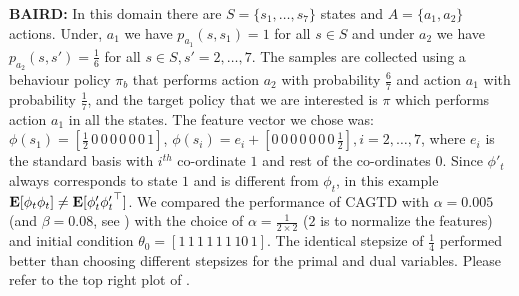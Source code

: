 \textbf{BAIRD:} In this domain there are $S=\{s_1,\ldots,s_7\}$ states and $A=\{a_1,a_2\}$ actions. Under, $a_1$ we have $p_{a_1}(s,s_1)=1$ for all $s\in S$ and under $a_2$ we have $p_{a_2}(s,s')=\frac{1}{6}$ for all $s\in S, s'=2,\ldots,7$. The samples are collected using a behaviour policy $\pi_b$ that performs action $a_2$ with probability $\frac{6}{7}$ and action $a_1$ with probability $\frac17$, and the target policy that we are interested is $\pi$ which performs action $a_1$ in all the states. The feature vector we chose was: $\phi(s_1)=[\frac{1}{2}\,0\,0\,0\,0\,0\,0\,1]$, $\phi(s_i)=e_i+[0\,0\,0\,0\,0\,0\,0\,\frac{1}{2}], i=2,\ldots,7$, where $e_i$ is the standard basis with $i^{th}$ co-ordinate $1$ and rest of the co-ordinates $0$. Since $\phi'_t$ always corresponds to state $1$ and is different from $\phi_t$, in this example $\mathbf{E}[{\phi_t\phi_t}]\neq\mathbf{E}[{\phi'_t{\phi'_t}^\top}]$.
We compared the performance of CAGTD with $\alpha=0.005$ (and $\beta=0.08$, see \cite{gtdmp}) with the choice of $\alpha=\frac{1}{2\times 2}$ ($2$ is to normalize the features) and initial condition $\theta_0=[1\, 1\, 1\, 1\, 1\, 1\, 10\, 1]$. The identical stepsize of $\frac{1}{4}$ performed better than choosing different stepsizes for the primal and dual variables. Please refer to the top right plot of . 

